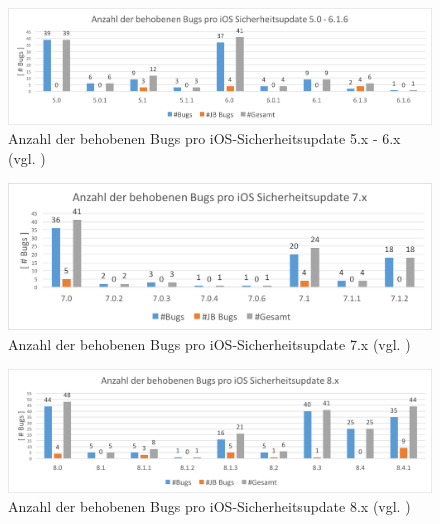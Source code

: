 \begin{figure}[htbp!]
        \centering
                \includegraphics[scale=0.5]{Bilder/iOSSicherheitsupdate5.png}
        \caption{Anzahl der behobenen Bugs pro iOS-Sicherheitsupdate 5.x - 6.x \newline (vgl. \cite{Apple[7]}) \protect\footnotemark}
        \label{fig:AnalyseiOSSicherheitsupdate5}
\end{figure}

\newpage
\begin{figure}[htbp!]
        \centering
                \includegraphics[scale=0.7]{Bilder/iOSSicherheitsupdate7.png}
        \caption{Anzahl der behobenen Bugs pro iOS-Sicherheitsupdate 7.x \newline (vgl. \cite{Apple[7]}) \protect\footnotemark}
        \label{fig:AnalyseiOSSicherheitsupdate7}
\end{figure}
\begin{figure}[htbp!]
        \centering
                \includegraphics[scale=0.54]{Bilder/iOSSicherheitsupdate8.png}
        \caption{Anzahl der behobenen Bugs pro iOS-Sicherheitsupdate 8.x \newline (vgl. \cite{Apple[7]}) \protect\footnotemark}
        \label{fig:AnalyseiOSSicherheitsupdate8}
\end{figure}

